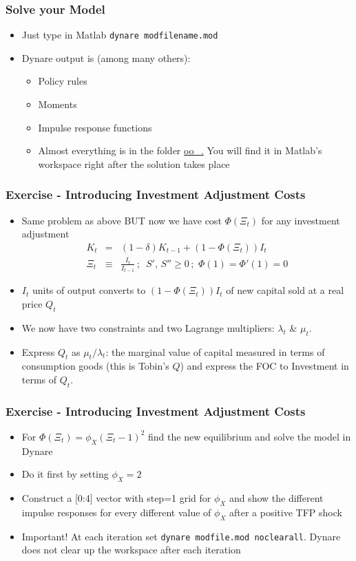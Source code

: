 \documentclass[xcolor=dvipsnames,handout,aspectratio=169]{beamer}
\begin{document}
\begin{frame}[t]\frametitle{\textbf{Solve your Model}}
  \begin{itemize}
  \setlength\itemsep{1em}
  \item Just type in Matlab \texttt{dynare modfilename.mod} 
  \item Dynare output is (among many others):
  \begin{itemize}
      \setlength\itemsep{1em}
    \item Policy rules
    \item Moments 
    \item Impulse response functions
    \item Almost everything is in the folder  \url{oo\_.} You will find it in Matlab's workspace right after the solution takes place
  \end{itemize}
 \end{itemize}
\end{frame}

\begin{frame}[t]\frametitle{\textbf{Exercise - Introducing Investment Adjustment Costs}}
  \begin{itemize}
  \setlength\itemsep{1em}
  \item Same problem as above BUT now we have cost $\Phi(\Xi_t)$ for any investment adjustment 
\begin{eqnarray}  \nonumber 
K_{t}&=&(1-\delta) K_{t-1}+(1-\Phi(\Xi_t))I_t\,\\ \nonumber 
\Xi_t&\equiv&\frac{I_t}{I_{t-1}}\,; \,\,\, S',\, S'' \ge
0\,;\,\,\Phi(1)=\Phi'(1)=0 \label{Kaccum1}
 \end{eqnarray}
\item $I_t$ units of output converts to $(1-\Phi(\Xi_t))I_t$ of new capital sold at a real price $Q_t$ 
\item We now have two constraints and two Lagrange multipliers: $\lambda_t$ \& $\mu_t$. 
\item Express $Q_t$ as $\mu_t/\lambda_t$: the marginal value of capital measured in terms of consumption goods (this is Tobin's $Q$) and express the FOC to Investment in terms of $Q_t$.
 \end{itemize}
\end{frame}

\begin{frame}[t]\frametitle{\textbf{Exercise - Introducing Investment Adjustment Costs}}
  \begin{itemize}
      \setlength\itemsep{1em}
\item For  $\Phi(\Xi_t)=\phi_X (\Xi_t-1)^2$ find the new equilibrium and solve the model in Dynare
\item Do it first by setting  $\phi_X = 2$
\item Construct a [0:4] vector with step=1 grid for $\phi_X$ and show the different impulse responses for every different value of $\phi_X$ after a positive TFP shock
\item Important! At each iteration set \texttt{dynare modfile.mod \color{red}noclearall}. Dynare does not clear up the workspace after each iteration
 \end{itemize}
\end{frame}
\end{document}
